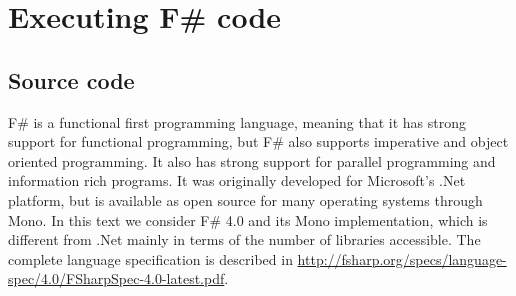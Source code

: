 \chapter{Executing F\# code}

\section{Source code}
F\# is a functional first programming language, meaning that it has strong support for functional programming, but F\# also supports imperative and object oriented programming. It also has strong support for parallel programming and information rich programs. It was originally developed for Microsoft's .Net platform, but is available as open source for many operating systems through Mono. In this text we consider F\# 4.0 and its Mono implementation, which is different from .Net mainly in terms of the number of libraries accessible. The complete language specification is described in \url{http://fsharp.org/specs/language-spec/4.0/FSharpSpec-4.0-latest.pdf}. 

